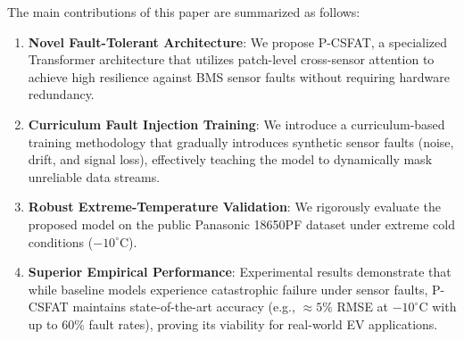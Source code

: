\documentclass[journal]{IEEEtran}
\begin{document}
The main contributions of this paper are summarized as follows:
\begin{enumerate}
    \item \textbf{Novel Fault-Tolerant Architecture}: We propose P-CSFAT, a specialized Transformer architecture that utilizes patch-level cross-sensor attention to achieve high resilience against BMS sensor faults without requiring hardware redundancy.
    \item \textbf{Curriculum Fault Injection Training}: We introduce a curriculum-based training methodology that gradually introduces synthetic sensor faults (noise, drift, and signal loss), effectively teaching the model to dynamically mask unreliable data streams.
    \item \textbf{Robust Extreme-Temperature Validation}: We rigorously evaluate the proposed model on the public Panasonic 18650PF dataset \cite{kollmeyer2018panasonic} under extreme cold conditions ($-10^\circ\text{C}$).
    \item \textbf{Superior Empirical Performance}: Experimental results demonstrate that while baseline models experience catastrophic failure under sensor faults, P-CSFAT maintains state-of-the-art accuracy (e.g., $\approx 5\%$ RMSE at $-10^\circ\text{C}$ with up to $60\%$ fault rates), proving its viability for real-world EV applications.
\end{enumerate}
\end{document}

